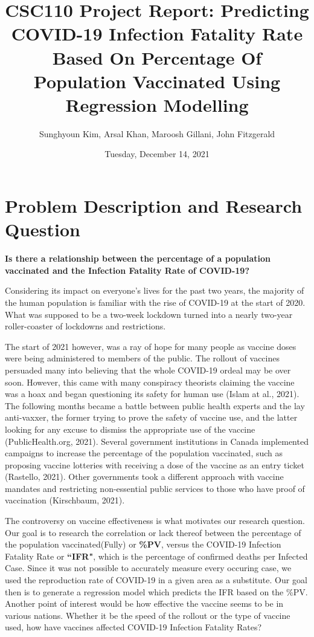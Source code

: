 \documentclass[fontsize=11pt]{article}
\title{CSC110 Project Report: Predicting COVID-19 Infection Fatality Rate Based On Percentage Of Population Vaccinated Using Regression Modelling}
\author{Sunghyoun Kim, Arsal Khan, Maroosh Gillani, John Fitzgerald}
\date{Tuesday, December 14, 2021}
\begin{document}
  
  
\maketitle  
  
  
\section*{Problem Description and Research Question}  
  
  
\textbf{Is there a relationship between the percentage of a population vaccinated and the Infection Fatality Rate of COVID-19?}  
  
  
Considering its impact on everyone’s lives for the past two years, the majority of the human population is familiar with the rise of COVID-19 at the start of 2020. What was supposed to be a two-week lockdown turned into a nearly two-year roller-coaster of lockdowns and restrictions.  
  
  
The start of 2021 however, was a ray of hope for many people as vaccine doses were being administered to members of the public. The rollout of vaccines persuaded many into believing that the whole COVID-19 ordeal may be over soon. However, this came with many conspiracy theorists claiming the vaccine was a hoax and began questioning its safety for human use (Islam at al., 2021). The following months became a battle between public health experts and the lay anti-vaxxer, the former trying to prove the safety of vaccine use, and the latter looking for any excuse to dismiss the appropriate use of the vaccine (PublicHealth.org, 2021). Several government institutions in Canada implemented campaigns to increase the percentage of the population vaccinated, such as proposing vaccine lotteries with receiving a dose of the vaccine as an entry ticket (Rastello, 2021). Other governments took a different approach with vaccine mandates and restricting non-essential public services to those who have proof of vaccination (Kirschbaum, 2021).   
  
The controversy on vaccine effectiveness is what motivates our research question. Our goal is to research the correlation or lack thereof between the percentage of the population vaccinated(Fully) or \textbf{\%PV}, versus the COVID-19 Infection Fatality Rate or \textbf{``IFR"}, which is the percentage of confirmed deaths per Infected Case. Since it was not possible to accurately measure every occuring case, we used the reproduction rate of COVID-19 in a given area as a substitute. Our goal then is to generate a regression model which predicts the IFR based on the \%PV. Another point of interest would be how effective the vaccine seems to be in various nations. Whether it be the speed of the rollout or the type of vaccine used, how have vaccines affected COVID-19 Infection Fatality Rates?   
  
\end{document}
